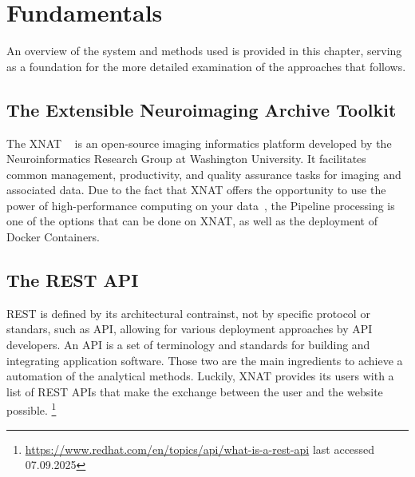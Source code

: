 
\chapter{Fundamentals}

An overview of the system and methods used is provided in this chapter, serving as a foundation for the more detailed examination of the approaches that follows. 

\section{The Extensible Neuroimaging Archive Toolkit}
The \ac{XNAT} ~\cite{marcus_extensible_2007} is an open-source imaging informatics platform developed by the Neuroinformatics Research Group at Washington University. It facilitates common management, productivity, and quality assurance tasks for imaging and associated data. Due to the fact that XNAT offers the opportunity to use the power of high-performance computing on your data~\cite{zaschke_extending_2024}, 
 the Pipeline processing is one of the options that can be done on XNAT, as well as the deployment of Docker Containers.


\section{The REST API}
\ac{REST} is defined by its architectural contrainst, not by specific protocol or standars, such as API, allowing for various deployment approaches by API developers.
An \ac{API} is a set of terminology and standards for building and integrating application software. Those two are the main ingredients to achieve a automation of the analytical methods.  Luckily, XNAT provides its users with a list of REST APIs that make the exchange between the user and the website possible. 
 \footnote{\url{https://www.redhat.com/en/topics/api/what-is-a-rest-api}{ last accessed 07.09.2025}}

